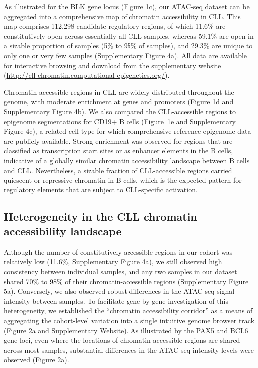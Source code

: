 \documentclass[10pt,]{article}
\begin{document}
As illustrated for the BLK gene locus (Figure 1c), our ATAC-seq dataset
can be aggregated into a comprehensive map of chromatin accessibility in
CLL. This map comprises 112,298 candidate regulatory regions, of which
11.6\% are constitutively open across essentially all CLL samples,
whereas 59.1\% are open in a sizable proportion of samples (5\% to 95\%
of samples), and 29.3\% are unique to only one or very few samples
(Supplementary Figure 4a). All data are available for interactive
browsing and download from the supplementary website
(\url{http://cll-chromatin.computational-epigenetics.org/}).

Chromatin-accessible regions in CLL are widely distributed throughout
the genome, with moderate enrichment at genes and promoters (Figure 1d
and Supplementary Figure 4b). We also compared the CLL-accessible
regions to epigenome segmentations for CD19+ B cells (Figure~1e and
Supplementary Figure 4c), a related cell type for which comprehensive
reference epigenome data are publicly available\citep{Kundaje2015}.
Strong enrichment was observed for regions that are classified as
transcription start sites or as enhancer elements in the B cells,
indicative of a globally similar chromatin accessibility landscape
between B cells and CLL. Nevertheless, a sizable fraction of
CLL-accessible regions carried quiescent or repressive chromatin in B
cells, which is the expected pattern for regulatory elements that are
subject to CLL-specific activation.

\subsection{Heterogeneity in the CLL chromatin accessibility
landscape}\label{heterogeneity-in-the-cll-chromatin-accessibility-landscape}

Although the number of constitutively accessible regions in our cohort
was relatively low (11.6\%, Supplementary Figure 4a), we still observed
high consistency between individual samples, and any two samples in our
dataset shared 70\% to 98\% of their chromatin-accessible regions
(Supplementary Figure 5a). Conversely, we also observed robust
differences in the ATAC-seq signal intensity between samples. To
facilitate gene-by-gene investigation of this heterogeneity, we
established the ``chromatin accessibility corridor'' as a means of
aggregating the cohort-level variation into a single intuitive genome
browser track (Figure 2a and Supplementary Website). As illustrated by
the PAX5 and BCL6 gene loci, even where the locations of chromatin
accessible regions are shared across most samples, substantial
differences in the ATAC-seq intensity levels were observed (Figure 2a).
\end{document}
